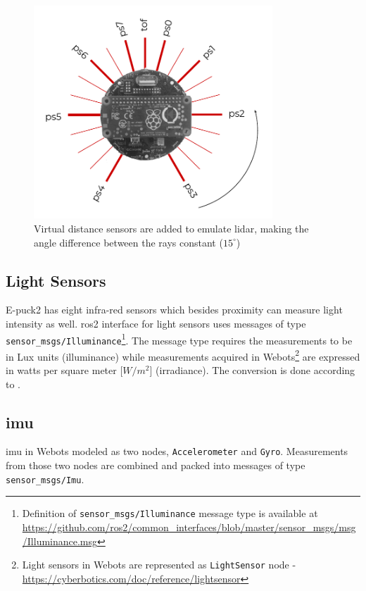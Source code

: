 \begin{figure}[H]
    \centering
    \includegraphics[width=0.8\textwidth]{simulation/figures/laserscan.pdf}
    \caption{Virtual distance sensors are added to emulate \ac{lidar}, making the angle difference between the rays constant ($15^\circ$)}
    \label{fig:simulation:laserscan}
\end{figure}

\subsection{Light Sensors}
E-puck2 has eight infra-red sensors which besides proximity can measure light intensity as well.
\ac{ros2} interface for light sensors uses messages of type \texttt{sensor\_msgs/Illuminance}\footnote{Definition of \texttt{sensor\_msgs/Illuminance} message type is available at \url{https://github.com/ros2/common_interfaces/blob/master/sensor_msgs/msg/Illuminance.msg}}.
The message type requires the measurements to be in Lux units (illuminance) while measurements acquired in Webots\footnote{Light sensors in Webots are represented as \texttt{LightSensor} node - \url{https://cyberbotics.com/doc/reference/lightsensor}} are expressed in watts per square meter [$W/m^2$] (irradiance). 
The conversion is done according to \cite{michael_conversion_2019}.

\subsection{\acl{imu}}
\ac{imu} in Webots modeled as two nodes, \texttt{Accelerometer} and \texttt{Gyro}.
Measurements from those two nodes are combined and packed into messages of type \texttt{sensor\_msgs/Imu}.

